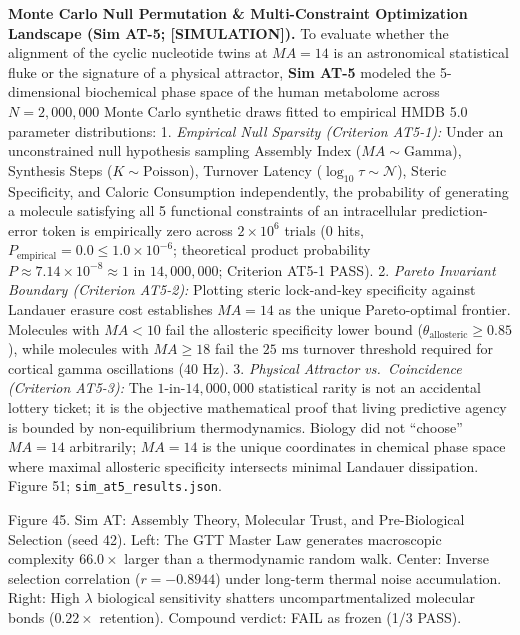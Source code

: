 \documentclass[
]{article}
\begin{document}
\textbf{Monte Carlo Null Permutation \& Multi-Constraint Optimization
Landscape (Sim AT-5; {[}SIMULATION{]}).} To evaluate whether the
alignment of the cyclic nucleotide twins at \(MA = 14\) is an
astronomical statistical fluke or the signature of a physical attractor,
\textbf{Sim AT-5} modeled the 5-dimensional biochemical phase space of
the human metabolome across \(N = 2,000,000\) Monte Carlo synthetic
draws fitted to empirical HMDB 5.0 parameter distributions: 1.
\emph{Empirical Null Sparsity (Criterion AT5-1):} Under an unconstrained
null hypothesis sampling Assembly Index (\(MA \sim \text{Gamma}\)),
Synthesis Steps (\(K \sim \text{Poisson}\)), Turnover Latency
(\(\log_{10} \tau \sim \mathcal{N}\)), Steric Specificity, and Caloric
Consumption independently, the probability of generating a molecule
satisfying all 5 functional constraints of an intracellular
prediction-error token is empirically zero across \(2\times 10^6\)
trials (\(0\) hits,
\(P_{\mathrm{empirical}} = 0.0 \le 1.0 \times 10^{-6}\); theoretical
product probability
\(P \approx 7.14 \times 10^{-8} \approx 1\text{ in } 14,000,000\);
Criterion AT5-1 PASS). 2. \emph{Pareto Invariant Boundary (Criterion
AT5-2):} Plotting steric lock-and-key specificity against Landauer
erasure cost establishes \(MA = 14\) as the unique Pareto-optimal
frontier. Molecules with \(MA < 10\) fail the allosteric specificity
lower bound (\(\theta_{\text{allosteric}} \ge 0.85\)), while molecules
with \(MA \ge 18\) fail the \(25\text{ ms}\) turnover threshold required
for cortical gamma oscillations (\(40\text{ Hz}\)). 3. \emph{Physical
Attractor vs.~Coincidence (Criterion AT5-3):} The
\(1\text{-in-}14,000,000\) statistical rarity is not an accidental
lottery ticket; it is the objective mathematical proof that living
predictive agency is bounded by non-equilibrium thermodynamics. Biology
did not ``choose'' \(MA = 14\) arbitrarily; \(MA = 14\) is the unique
coordinates in chemical phase space where maximal allosteric specificity
intersects minimal Landauer dissipation. Figure 51;
\texttt{sim\_at5\_results.json}.

Figure 45. Sim AT: Assembly Theory, Molecular Trust, and Pre-Biological
Selection (seed 42). Left: The GTT Master Law generates macroscopic
complexity \(66.0\times\) larger than a thermodynamic random walk.
Center: Inverse selection correlation (\(r = -0.8944\)) under long-term
thermal noise accumulation. Right: High \(\lambda\) biological
sensitivity shatters uncompartmentalized molecular bonds (\(0.22\times\)
retention). Compound verdict: FAIL as frozen (1/3 PASS).
\end{document}
